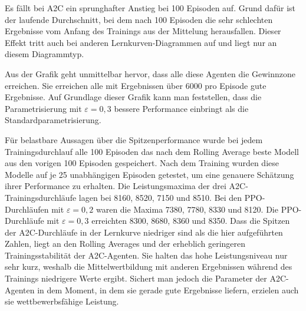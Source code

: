 Es fällt bei A2C ein sprunghafter Anstieg bei 100 Episoden auf.
Grund dafür ist der laufende Durchschnitt, bei dem nach 100 Episoden die sehr schlechten Ergebnisse vom Anfang des Trainings aus der Mittelung herausfallen.
Dieser Effekt tritt auch bei anderen Lernkurven-Diagrammen auf und liegt nur an diesem Diagrammtyp.

Aus der Grafik geht unmittelbar hervor, dass alle diese Agenten die Gewinnzone erreichen.
Sie erreichen alle mit Ergebnissen über 6000 pro Episode gute Ergebnisse.
Auf Grundlage dieser Grafik kann man feststellen, dass die Parametrisierung mit $\varepsilon=0{,}3$ bessere Performance einbringt als die Standardparametrisierung.

Für belastbare Aussagen über die Spitzenperformance wurde bei jedem Trainingsdurchlauf alle 100 Episoden das nach dem Rolling Average beste Modell aus den vorigen 100 Episoden gespeichert.
Nach dem Training wurden diese Modelle auf je 25 unabhängigen Episoden getestet, um eine genauere Schätzung ihrer Performance zu erhalten.
Die Leistungsmaxima der drei A2C-Trainingsdurchläufe lagen bei 8160, 8520, 7150 und 8510.
Bei den PPO-Durchläufen mit $\varepsilon=0{,}2$ waren die Maxima 7380, 7780, 8330 und 8120.
Die PPO-Durchläufe mit $\varepsilon=0{,}3$ erreichten 8300, 8680, 8360 und 8350.
Dass die Spitzen der A2C-Durchläufe in der Lernkurve niedriger sind als die hier aufgeführten Zahlen, liegt an den Rolling Averages und der erheblich geringeren Trainingsstabilität der A2C-Agenten.
Sie halten das hohe Leistungsniveau nur sehr kurz, weshalb die Mittelwertbildung mit anderen Ergebnissen während des Trainings niedrigere Werte ergibt.
Sichert man jedoch die Parameter der A2C-Agenten in dem Moment, in dem sie gerade gute Ergebnisse liefern, erzielen auch sie wettbewerbsfähige Leistung.

